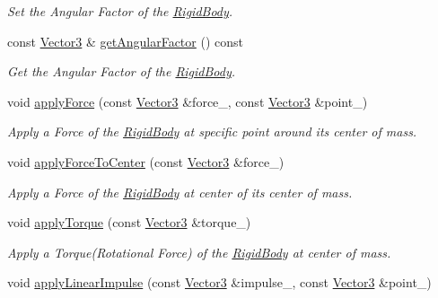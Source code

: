 \begin{DoxyCompactItemize}
\begin{DoxyCompactList}\small\item\em Set the Angular Factor of the \hyperlink{class_i_dream_sky_1_1_physics3_1_1_rigid_body}{Rigid\+Body}. \end{DoxyCompactList}\item 
const \hyperlink{class_i_dream_sky_1_1_vector3}{Vector3} \& \hyperlink{class_i_dream_sky_1_1_physics3_1_1_rigid_body_a6c13cef6cb8baa62de37b35caf42ba32}{get\+Angular\+Factor} () const 
\begin{DoxyCompactList}\small\item\em Get the Angular Factor of the \hyperlink{class_i_dream_sky_1_1_physics3_1_1_rigid_body}{Rigid\+Body}. \end{DoxyCompactList}\item 
void \hyperlink{class_i_dream_sky_1_1_physics3_1_1_rigid_body_ab2f4fd2a004f2dc740e86e36d94d5b90}{apply\+Force} (const \hyperlink{class_i_dream_sky_1_1_vector3}{Vector3} \&force\+\_\+, const \hyperlink{class_i_dream_sky_1_1_vector3}{Vector3} \&point\+\_\+)
\begin{DoxyCompactList}\small\item\em Apply a Force of the \hyperlink{class_i_dream_sky_1_1_physics3_1_1_rigid_body}{Rigid\+Body} at specific point around its center of mass. \end{DoxyCompactList}\item 
void \hyperlink{class_i_dream_sky_1_1_physics3_1_1_rigid_body_a7aeb196f8670a2e820ae4c829a7ab069}{apply\+Force\+To\+Center} (const \hyperlink{class_i_dream_sky_1_1_vector3}{Vector3} \&force\+\_\+)
\begin{DoxyCompactList}\small\item\em Apply a Force of the \hyperlink{class_i_dream_sky_1_1_physics3_1_1_rigid_body}{Rigid\+Body} at center of its center of mass. \end{DoxyCompactList}\item 
void \hyperlink{class_i_dream_sky_1_1_physics3_1_1_rigid_body_a78b659c6e60a30b97251440c6c12e445}{apply\+Torque} (const \hyperlink{class_i_dream_sky_1_1_vector3}{Vector3} \&torque\+\_\+)
\begin{DoxyCompactList}\small\item\em Apply a Torque(\+Rotational Force) of the \hyperlink{class_i_dream_sky_1_1_physics3_1_1_rigid_body}{Rigid\+Body} at center of mass. \end{DoxyCompactList}\item 
void \hyperlink{class_i_dream_sky_1_1_physics3_1_1_rigid_body_a631accd90e4b499cfbe5b691ac07b905}{apply\+Linear\+Impulse} (const \hyperlink{class_i_dream_sky_1_1_vector3}{Vector3} \&impulse\+\_\+, const \hyperlink{class_i_dream_sky_1_1_vector3}{Vector3} \&point\+\_\+)

\end{DoxyCompactItemize}
